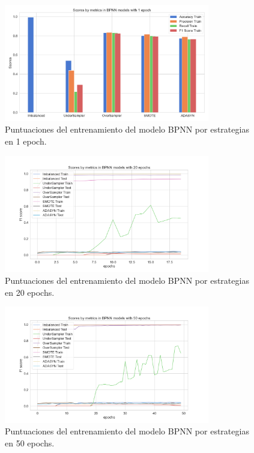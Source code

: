 \begin{figure}[h!]
	\centering
	\includegraphics[width=0.8\textwidth]{"figuras/Experimento5/BPNN/BPNN_1_train"}
	\caption{Puntuaciones del entrenamiento del modelo BPNN por estrategias en 1 epoch.}
	\label{an:47}
\end{figure}

\begin{figure}[h!]
	\centering
	\includegraphics[width=0.8\textwidth]{"figuras/Experimento5/BPNN/BPNN_20_train"}
	\caption{Puntuaciones del entrenamiento del modelo BPNN por estrategias en 20 epochs.}
	\label{an:48}
\end{figure}

\begin{figure}[h!]
	\centering
	\includegraphics[width=0.8\textwidth]{"figuras/Experimento5/BPNN/BPNN_50_train"}
	\caption{Puntuaciones del entrenamiento del modelo BPNN por estrategias en 50 epochs.}
	\label{an:49}
\end{figure}

